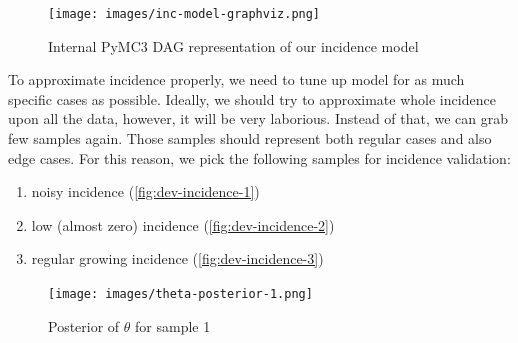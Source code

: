 \documentclass[
  digital, %
  oneside, %
  lof,     %
  lot,     %
]{fithesis4}
\begin{document}
\begin{figure}[h]
  \begin{center}
    \texttt{[image: images/inc-model-graphviz.png]}
  \end{center}
  \caption{Internal PyMC3 DAG representation of our incidence model}
  \label{fig:inc-model-graphviz}
\end{figure}

To approximate incidence properly, we need to tune up model for
as much specific cases as possible. Ideally, we should try to approximate
whole incidence upon all the data, however, it will be very laborious.
Instead of that, we can grab few samples again. Those samples should
represent both regular cases and also edge cases.
For this reason, we pick the following samples for incidence validation:

\begin{enumerate}
  \item noisy incidence (\ref{fig:dev-incidence-1})
  \item low (almost zero) incidence (\ref{fig:dev-incidence-2})
  \item regular growing incidence (\ref{fig:dev-incidence-3})
\end{enumerate}

\begin{figure}[h]
  \begin{center}
    \texttt{[image: images/theta-posterior-1.png]}
  \end{center}
  \caption{Posterior of $\theta$ for sample 1}
  \label{fig:theta-posterior-1}
\end{figure}


\end{document}
